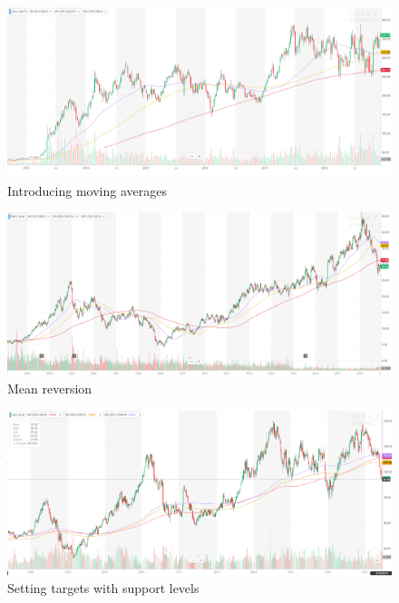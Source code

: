 \documentclass{article}
\begin{document}
\vspace{10pt}

\begin{figure}[!htb]
    \centering
    \includegraphics[width=\textwidth]{imgs/72.png}
    \caption{Introducing moving averages}
\end{figure}

\vspace{10pt}

\begin{figure}[!htb]
    \centering
    \includegraphics[width=\textwidth]{imgs/73.png}
    \caption{Mean reversion}
\end{figure}

\vspace{10pt}

\begin{figure}[!htb]
    \centering
    \includegraphics[width=\textwidth]{imgs/74.png}
    \caption{Setting targets with support levels}
\end{figure}
\end{document}
